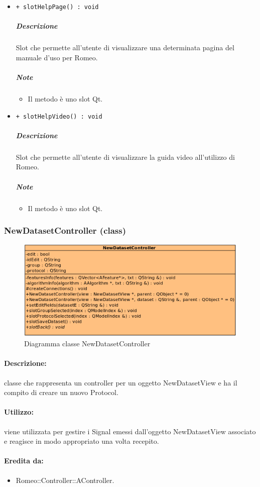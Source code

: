 \begin{itemize}
\begin{itemize}
			\end{itemize}
			\item \color{blue} \verb!+ slotHelpPage() : void!
			\color{black}
			\subparagraph{Descrizione} Slot\g{} che permette all'utente di visualizzare una determinata pagina del manuale d'uso per Romeo.
			\subparagraph{Note}
			\begin{itemize}
				\item Il metodo è uno slot\g{} Qt\g{}.
			\end{itemize}
			\item \color{blue} \verb!+ slotHelpVideo() : void!
			\color{black}
			\subparagraph{Descrizione} Slot\g{} che permette all'utente di visualizzare la guida video all'utilizzo di Romeo.
			\subparagraph{Note}
			\begin{itemize}
				\item Il metodo è uno slot\g{} Qt\g{}.
			\end{itemize}
		\end{itemize}
		\pagebreak
	\subsubsection{NewDatasetController (class)}
	\begin{figure}[!h]
		\centering
		\includegraphics[width=0.7\linewidth]{./Content/Immagini/controller/NewDatasetController.png}
		\caption{Diagramma classe NewDatasetController}
	\end{figure}
	\paragraph{Descrizione:} classe che rappresenta un controller per un oggetto NewDatasetView e ha il compito di creare un nuovo Protocol\g{}.
	\paragraph{Utilizzo:} viene utilizzata per gestire i Signal\g{} emessi dall'oggetto NewDatasetView associato e reagisce in modo appropriato una volta recepito.
	\paragraph{Eredita da:}
		\begin{itemize}
			\item Romeo::Controller::AController.
		\end{itemize}
